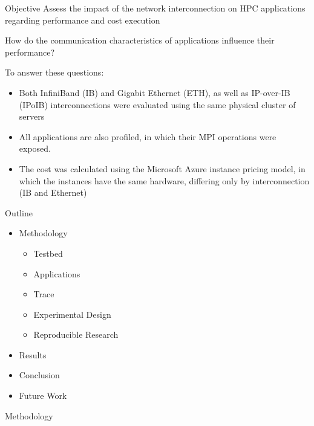 \documentclass[presentation]{beamer}
\begin{document}
\begin{frame}{Objective}
\vfill
Assess the impact of the \alert{network interconnection} on HPC applications regarding performance and cost execution

\pause \vfill
How do the \alert{communication characteristics} of applications influence their performance?

\pause \vfill
To answer these questions:

\pause \vfill
\begin{itemize}
    \item  Both \alert{InfiniBand (IB)} and \alert{Gigabit Ethernet (ETH)}, as well as \alert{IP-over-IB (IPoIB)} interconnections were evaluated using the same physical cluster of servers
\pause \vfill
    \item All applications are also profiled, in which their MPI operations were exposed.
\pause \vfill
    \item The cost was calculated using the Microsoft Azure instance pricing model, in which the instances have the same hardware, differing only by interconnection (IB and Ethernet)
\end{itemize}
\vfill
\end{frame}

\begin{frame}{Outline}
\vfill
\Large
\begin{itemize}
\item Methodology
\begin{itemize}
\item Testbed
\item Applications
\item Trace
\item Experimental Design
\item Reproducible Research
\end{itemize}
\end{itemize}
\vfill
\begin{itemize}
\item Results
\end{itemize}
\begin{itemize}
\item Conclusion
\item Future Work
\end{itemize}
\end{frame}

\begin{frame}  
\begin{block}{}
\begin{center}
\Huge{Methodology}
\end{center}
\end{block}
\end{frame}
\end{document}
